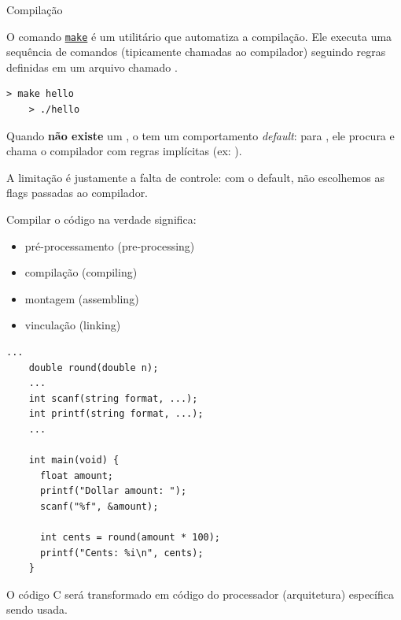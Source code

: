 \documentclass{beamer}
\begin{document}
\begin{frame}{Compilação}
  \framebreak

  O comando
  \href{https://www.gnu.org/software/make/}{\texttt{make}} é um
  utilitário que automatiza a compilação. Ele executa uma sequência de
  comandos (tipicamente chamadas ao compilador) seguindo regras
  definidas em um arquivo chamado .

  \begin{lstlisting}[style=normalbash]
    > make hello
    > ./hello
  \end{lstlisting}

  Quando \textbf{não existe} um , o  tem
  um comportamento \emph{default}: para , ele
  procura  e chama o compilador com regras implícitas
  (ex: ).

  A limitação é justamente a falta de controle: com o 
  default, não escolhemos as flags passadas ao compilador.

  \framebreak

  Compilar o código na verdade significa:

  \begin{itemize}
  \item pré-processamento (pre-processing)
  \item compilação (compiling)
  \item montagem (assembling)
  \item vinculação (linking)   
  \end{itemize}

  \framebreak
  
  

  \framebreak

  \begin{lstlisting}[style=normalc]
    ...
    double round(double n);
    ...
    int scanf(string format, ...);
    int printf(string format, ...);
    ...

    int main(void) {
      float amount;
      printf("Dollar amount: ");
      scanf("%f", &amount);

      int cents = round(amount * 100);
      printf("Cents: %i\n", cents);
    }
  \end{lstlisting}
  
  \framebreak
  
  O código C será transformado em código do processador (arquitetura)
  específica sendo usada.\vspace{.5cm}


\end{frame}
\end{document}
